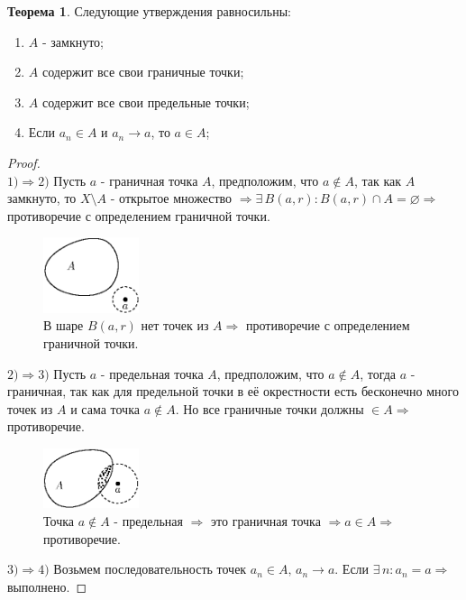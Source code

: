 \documentclass[12pt]{article}
\newcommand{\VN}{\varnothing}
\theoremstyle{definition}
\newtheorem{theorem}{Теорема}
\begin{document}
\begin{theorem}
	Следующие утверждения равносильны:
	\begin{enumerate}[label ={\arabic*)}]
		\item $A$ - замкнуто;
		\item $A$ содержит все свои граничные точки;
		\item $A$ содержит все свои предельные точки;
		\item Если $a_n \in A$ и $a_n \to a$, то $a \in A$;
	\end{enumerate}
\end{theorem}
\begin{proof}\hfill\\
	$1) \Rightarrow 2)$ Пусть $a$ - граничная точка $A$, предположим, что $a \notin A$, так как $A$ замкнуто, то $X \setminus A$ - открытое множество $\Rightarrow \exists \, B(a,r) \colon B(a,r)\cap A = \VN \Rightarrow$ противоречие с определением граничной точки.
	\begin{figure}[H]
		\centering
		\includegraphics[width=0.25\textwidth]{7_4.eps}
		\caption{В шаре $B(a,r)$ нет точек из $A \Rightarrow$ противоречие с определением граничной точки.}
		\label{7_4}
	\end{figure}
	$2) \Rightarrow 3)$ Пусть $a$ - предельная точка $A$, предположим, что $a \notin A$, тогда $a$ - граничная, так как для предельной точки в её окрестности есть бесконечно много точек из $A$ и сама точка $a \notin A$. Но все граничные точки должны $\in A \Rightarrow$ противоречие.
	\begin{figure}[H]
		\centering
		\includegraphics[width=0.25\textwidth]{7_5.eps}
		\caption{Точка $a \notin A$ - предельная $\Rightarrow$ это граничная точка $\Rightarrow a\in A \Rightarrow$ противоречие.}
		\label{7_5}
	\end{figure}
	$3) \Rightarrow 4)$ Возьмем последовательность точек $a_n \in A, \, a_n \to a$. Если $\exists \, n \colon a_n = a \Rightarrow$ выполнено. 
	

\end{proof}
\end{document}
